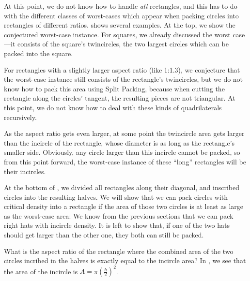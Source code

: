 \documentclass[a4paper,style=print,bibliography=totoc,nexus,lnum,extramargin]{tubsbook}
\begin{document}
At this point, we do not know how to handle \emph{all} rectangles, and this has to do with the different classes of worst-cases which appear when packing circles into rectangles of different ratios.  shows several examples. At the top, we show the conjectured worst-case instance. For squares, we already discussed the worst case---it consists of the square's twincircles, the two largest circles which can be packed into the square.


For rectangles with a slightly larger aspect ratio (like 1:1.3), we conjecture that the worst-case instance still consists of the rectangle's twincircles, but we do not know how to pack this area using Split Packing, because when cutting the rectangle along the circles' tangent, the resulting pieces are not triangular. At this point, we do not know how to deal with these kinds of quadrilaterals recursively.

As the aspect ratio gets even larger, at some point the twincircle area gets larger than the incircle of the rectangle, whose diameter is as long as the rectangle's smaller side. Obviously, any circle larger than this incircle cannot be packed, so from this point forward, the worst-case instance of these “long” rectangles will be their incircles.

At the bottom of , we divided all rectangles along their diagonal, and inscribed circles into the resulting halves. We will show that we can pack circles with critical density into a rectangle if the area of those two circles is at least as large as the worst-case area:
We know from the previous sections that we can pack right hats with incircle density. It is left to show that, if one of the two hats should get larger than the other one, they both can still be packed.

What is the aspect ratio of the rectangle where the combined area of the two circles incribed in the halves is exactly equal to the incircle area? In , we see that the area of the incircle is $A = \pi(\frac{h}{2})^2$.

\end{document}
